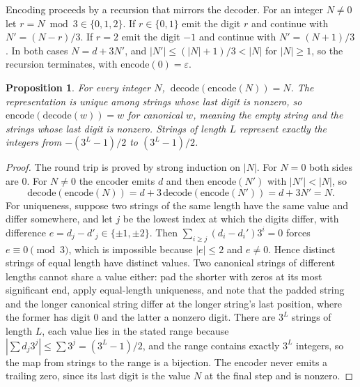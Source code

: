 \documentclass[11pt]{article}
\newtheorem{proposition}{Proposition}
\theoremstyle{definition}
\theoremstyle{remark}
\begin{document}
Encoding proceeds by a recursion that mirrors the decoder. For an integer $N \ne 0$ let $r = N \bmod 3 \in \{0,1,2\}$. If $r \in \{0,1\}$ emit the digit $r$ and continue with $N' = (N - r)/3$. If $r = 2$ emit the digit $-1$ and continue with $N' = (N+1)/3$. In both cases $N = d + 3N'$, and $|N'| \le (|N|+1)/3 < |N|$ for $|N| \ge 1$, so the recursion terminates, with $\mathrm{encode}(0) = \varepsilon$.

\begin{proposition}\label{prop:roundtrip}
For every integer $N$, $\ \mathrm{decode}(\mathrm{encode}(N)) = N$. The representation is unique among strings whose last digit is nonzero, so $\mathrm{encode}(\mathrm{decode}(w)) = w$ for canonical $w$, meaning the empty string and the strings whose last digit is nonzero. Strings of length $L$ represent exactly the integers from $-(3^{L}-1)/2$ to $(3^{L}-1)/2$.
\end{proposition}

\begin{proof}
The round trip is proved by strong induction on $|N|$. For $N = 0$ both sides are $0$. For $N \ne 0$ the encoder emits $d$ and then $\mathrm{encode}(N')$ with $|N'| < |N|$, so
\[
\mathrm{decode}(\mathrm{encode}(N)) = d + 3\,\mathrm{decode}(\mathrm{encode}(N')) = d + 3N' = N .
\]
For uniqueness, suppose two strings of the same length have the same value and differ somewhere, and let $j$ be the lowest index at which the digits differ, with difference $e = d_j - d'_j \in \{\pm 1, \pm 2\}$. Then $\sum_{i \ge j} (d_i - d_i')3^{i} = 0$ forces $e \equiv 0 \pmod 3$, which is impossible because $|e| \le 2$ and $e \ne 0$. Hence distinct strings of equal length have distinct values. Two canonical strings of different lengths cannot share a value either: pad the shorter with zeros at its most significant end, apply equal-length uniqueness, and note that the padded string and the longer canonical string differ at the longer string's last position, where the former has digit $0$ and the latter a nonzero digit. There are $3^{L}$ strings of length $L$, each value lies in the stated range because $|\sum d_j 3^{j}| \le \sum 3^{j} = (3^{L}-1)/2$, and the range contains exactly $3^{L}$ integers, so the map from strings to the range is a bijection. The encoder never emits a trailing zero, since its last digit is the value $N$ at the final step and is nonzero.
\end{proof}
\end{document}

